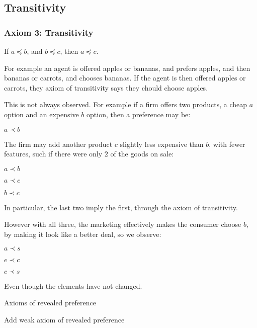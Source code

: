 
\subsection{Transitivity}

\subsubsection{Axiom 3: Transitivity}

If \(a\preceq b\), and \(b\preceq c\), then \(a\preceq c\).

For example an agent is offered apples or bananas, and prefers apples, and then bananas or carrots, and chooses bananas. If the agent is then offered apples or carrots, they axiom of transitivity says they chould choose apples.

This is not always observed. For example if a firm offers two products, a cheap \(a\) option and an expensive \(b\) option, then a preference may be:

\(a\prec b\)

The firm may add another product \(c\) slightly less expensive than \(b\), with fewer features, such if there were only \(2\) of the goods on sale:

\(a\prec b\)

\(a\prec c\)

\(b\prec c\)

In particular, the last two imply the first, through the axiom of transitivity.

However with all three, the marketing effectively makes the consumer choose \(b\), by making it look like a better deal, so we observe:

\(a\prec s\)

\(e\prec c\)

\(c\prec s\)

Even though the elements have not changed.

Axioms of revealed preference

Add weak axiom of revealed preference

